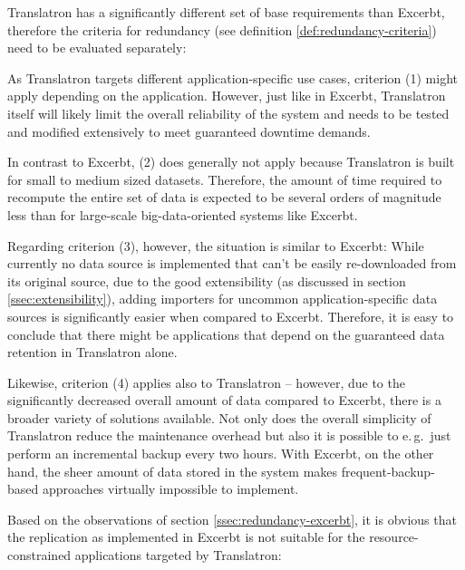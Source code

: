 \documentclass[a4paper, 12pt, twoside, reqn]{report}
\numberwithin{figure}{chapter}
\newtheorem[L]{boxedDefinition}{Definition}
\newtheorem[L]{boxedExample}{Example}
\newcommand{\eg}{e.\,g.\ }
\begin{document}
Translatron has a significantly different set of base requirements than Excerbt, therefore the criteria for redundancy (see definition \vref{def:redundancy-criteria}) need to be evaluated separately:

As Translatron targets different application-specific use cases, criterion (1) might apply depending on the application. However, just like in Excerbt, Translatron itself will likely limit the overall reliability of the system and needs to be tested and modified extensively to meet guaranteed downtime demands.

In contrast to Excerbt, (2) does generally not apply because Translatron is built for small to medium sized datasets. Therefore, the amount of time required to recompute the entire set of data is expected to be several orders of magnitude less than for large-scale big-data-oriented systems like Excerbt.

Regarding criterion (3), however, the situation is similar to Excerbt: While currently no data source is implemented that can't be easily re-downloaded from its original source, due to the good extensibility (as discussed in section \ref{ssec:extensibility}), adding importers for uncommon application-specific data sources is significantly easier when compared to Excerbt. Therefore, it is easy to conclude that there might be applications that depend on the guaranteed data retention in Translatron alone.

Likewise, criterion (4) applies also to Translatron -- however, due to the significantly decreased overall amount of data compared to Excerbt, there is a broader variety of solutions available. Not only does the overall simplicity of Translatron reduce the maintenance overhead but also it is possible to \eg just perform an incremental backup every two hours. With Excerbt, on the other hand, the sheer amount of data stored in the system makes frequent-backup-based approaches virtually impossible to implement.

Based on the observations of section \ref{ssec:redundancy-excerbt}, it is obvious that the replication as implemented in Excerbt is not suitable for the resource-constrained applications targeted by Translatron:
\end{document}
